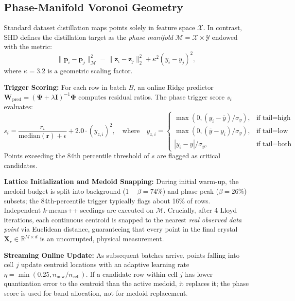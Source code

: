 \documentclass[11pt,a4paper]{article}
\begin{document}
\subsection{Phase-Manifold Voronoi Geometry}
Standard dataset distillation maps points solely in feature space $\mathcal{X}$. In contrast, SHD defines the distillation target as the \textit{phase manifold} $\mathcal{M} = \mathcal{X} \times \mathcal{Y}$ endowed with the metric:
\begin{equation}
    \|\mathbf{p}_i - \mathbf{p}_j\|_{\mathcal{M}}^2 = \|\mathbf{z}_i - \mathbf{z}_j\|_2^2 + \kappa^2 (y_i - y_j)^2,
\end{equation}
where $\kappa = 3.2$ is a geometric scaling factor.

\textbf{Trigger Scoring:} For each row in batch $B$, an online Ridge predictor $\mathbf{W}_{\text{pred}} = (\boldsymbol{\Psi} + \lambda \mathbf{I})^{-1}\boldsymbol{\Phi}$ computes residual ratios. The phase trigger score $s_i$ evaluates:
\begin{equation}
    s_i = \frac{r_i}{\text{median}(\mathbf{r}) + \epsilon} + 2.0 \cdot (y_{z, i})^2, \quad \text{where} \quad y_{z, i} =
    \begin{cases}
        \max(0, (y_i - \bar{y}) / \sigma_y), & \text{if } \text{tail} = \text{high} \\
        \max(0, (\bar{y} - y_i) / \sigma_y), & \text{if } \text{tail} = \text{low} \\
        |y_i - \bar{y}| / \sigma_y, & \text{if } \text{tail} = \text{both}
    \end{cases}
\end{equation}
Points exceeding the 84th percentile threshold of $s$ are flagged as critical candidates.

\textbf{Lattice Initialization and Medoid Snapping:} During initial warm-up, the medoid budget is split into background ($1 - \beta = 74\%$) and phase-peak ($\beta = 26\%$) subsets; the 84th-percentile trigger typically flags about 16\% of rows. Independent $k$-means++ seedings are executed on $\mathcal{M}$. Crucially, after 4 Lloyd iterations, each continuous centroid is snapped to the nearest \textit{real observed data point} via Euclidean distance, guaranteeing that every point in the final crystal $\mathbf{X}_c \in \mathbb{R}^{M \times d}$ is an uncorrupted, physical measurement.

\textbf{Streaming Online Update:} As subsequent batches arrive, points falling into cell $j$ update centroid locations with an adaptive learning rate $\eta = \min(0.25, n_{\text{new}}/n_{\text{cell}})$. If a candidate row within cell $j$ has lower quantization error to the centroid than the active medoid, it replaces it; the phase score is used for band allocation, not for medoid replacement.
\end{document}
